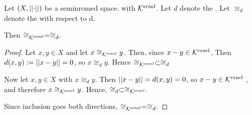 \label{prop:equivalencemodkernelispseudometricequivalence}
\begin{prop}
    Let $(X,\left|\left| \cdot \right|\right|)$ be a seminromed space.
    with \SeminormKernel $\bf\mathcal{K}\rm^{ernel}$.
    Let $d$ denote the \SeminormInducedPseudometric.
	Let $\cong_{d}$ denote the 
	\RelationOfZeroDistance with respect to d. 
    
    Then $\cong_{\bf\mathcal{K}\rm^{ernel}}=\cong_{d}$. 
    \begin{proof}
        Let $x,y \in X$ and let $x \cong_{\bf\mathcal{K}\rm^{ernel}}y$.
        Then, since $x-y \in \bf\mathcal{K}\rm^{ernel}$, 
        Then $d(x,y) := \left|\left| x-y \right|\right| =0$, so $x \cong_d y$. 
        Hence $\cong_{\bf\mathcal{K}\rm^{ernel}} \subset \cong_{d}$ 


        Now let $x,y \in X$ with $x \cong_d y$. 
        Then $\left|\left| x-y \right|\right|=d(x,y) = 0$, so $x-y \in \bf\mathcal{K}\rm^{ernel}$
        , and therefore $x \cong_{\bf\mathcal{K}\rm^{ernel}} y$. 
        Hence, $\cong_{d} \subset \cong_{\bf\mathcal{K}\rm^{ernel}}$. 

        Since inclusion goes both directions, $\cong_{\bf\mathcal{K}\rm^{ernel}} = \cong_d$.

    \end{proof} 
\end{prop}
